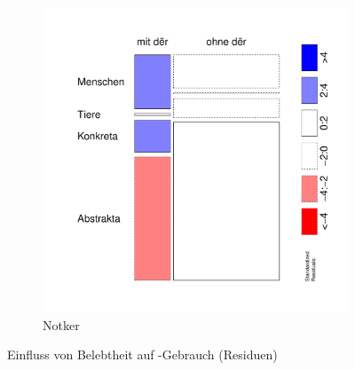 \begin{figure}
\begin{subfigure}[b]{.5\linewidth}
  \includegraphics[height=.25\textheight]{generated/images/residuals-bel-N}
\caption {Notker}
\end{subfigure}
\caption{Einfluss von Belebtheit auf -Gebrauch (Residuen)}
\label{fig:residuals-bel}
\end{figure}


